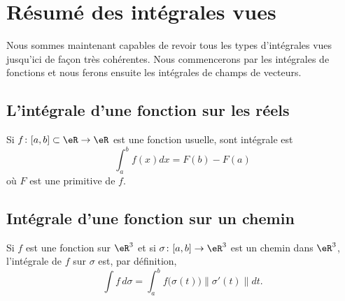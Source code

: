 \clearpage

\section{Résumé des intégrales vues}

Nous sommes maintenant capables de revoir tous les types d'intégrales vues jusqu'ici de façon très cohérentes. Nous commencerons par les intégrales de fonctions et nous ferons ensuite les intégrales de champs de vecteurs.

\subsection{L'intégrale d'une fonction sur les réels}

Si $f\colon \mathopen[ a , b \mathclose]\subset\eR\to \eR$ est une fonction usuelle, sont intégrale est
\begin{equation}
    \int_a^bf(x)dx=F(b)-F(a)
\end{equation}
où $F$ est une primitive de $f$.

\subsection{Intégrale d'une fonction sur un chemin}

Si $f$ est une fonction sur $\eR^3$ et si $\sigma\colon \mathopen[ a , b \mathclose]\to \eR^3$ est un chemin dans $\eR^3$, l'intégrale de $f$ sur $\sigma$ est, par définition, 
\begin{equation}
    \int f\,d\sigma=\int_a^b f\big( \sigma(t) \big)\| \sigma'(t) \|dt.
\end{equation}

